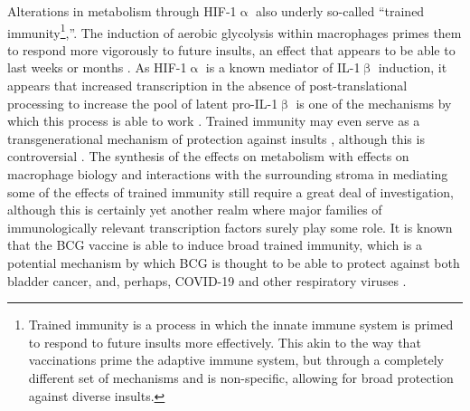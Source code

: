 Alterations in metabolism through HIF-1$\upalpha$ also underly so-called ``trained immunity\footnote{Trained immunity is a process in which the innate immune system is primed to respond to future insults more effectively. This akin to the way that vaccinations prime the adaptive immune system, but through a completely different set of mechanisms and is non-specific, allowing for broad protection against diverse insults.},''. The induction of aerobic glycolysis within macrophages primes them to respond more vigorously to future insults, an effect that appears to be able to last weeks or months \citep{Cheng2014}. As HIF-1$\upalpha$ is a known mediator of IL-1$\upbeta$ induction, it appears that increased transcription in the absence of post-translational processing to increase the pool of latent pro-IL-1$\upbeta$ is one of the mechanisms by which this process is able to work \citep{Arts2018}. Trained immunity may even serve as a transgenerational mechanism of protection against insults \citep{Katzmarski2021}, although this is controversial \citep{Kaufmann2022, Katzmarski2022}. The synthesis of the effects on metabolism with effects on macrophage biology and interactions with the surrounding stroma in mediating some of the effects of trained immunity still require a great deal of investigation, although this is certainly yet another realm where major families of immunologically relevant transcription factors surely play some role. It is known that the BCG vaccine is able to induce broad trained immunity, which is a potential mechanism by which BCG is thought to be able to protect against both bladder cancer, and, perhaps, COVID-19 and other respiratory viruses \citep{Arts2016, Arts2018, Covian2019, vanPuffelen2020, ONeill2020}.

